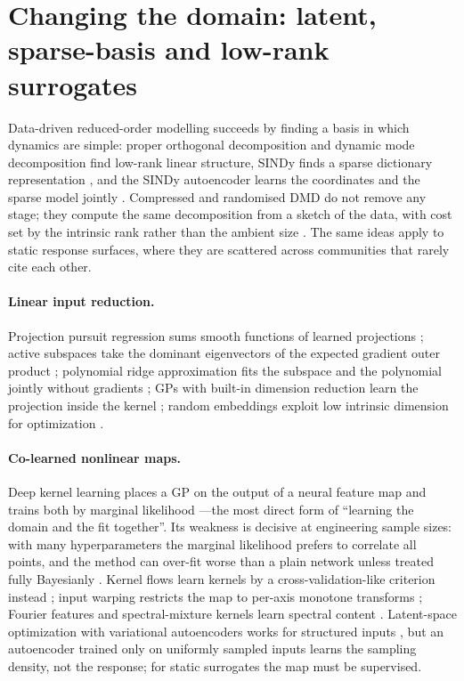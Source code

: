 \section{Changing the domain: latent, sparse-basis and low-rank surrogates}
\label{sec:latent}

Data-driven reduced-order modelling succeeds by finding a basis in which dynamics are simple: proper orthogonal
decomposition and dynamic mode decomposition find low-rank linear structure, SINDy finds a sparse dictionary
representation \cite{brunton2016discovering}, and the SINDy autoencoder learns the coordinates and the sparse model
jointly \cite{champion2019data}. Compressed and randomised DMD do not remove any stage; they compute the same
decomposition from a sketch of the data, with cost set by the intrinsic rank rather than the ambient size
\cite{erichson2019compressed,erichson2019randomized,halko2011finding}. The same ideas apply to static response surfaces,
where they are scattered across communities that rarely cite each other.

\paragraph{Linear input reduction.} Projection pursuit regression sums smooth functions of learned projections
\cite{friedman1981projection}; active subspaces take the dominant eigenvectors of the expected gradient outer product
\cite{constantine2015active}; polynomial ridge approximation fits the subspace and the polynomial jointly without
gradients \cite{hokanson2018data}; GPs with built-in dimension reduction learn the projection inside the kernel
\cite{tripathy2016gaussian}; random embeddings exploit low intrinsic dimension for optimization \cite{wang2016bayesian}.

\paragraph{Co-learned nonlinear maps.} Deep kernel learning places a GP on the output of a neural feature map and trains
both by marginal likelihood \cite{wilson2016deep}---the most direct form of ``learning the domain and the fit
together''. Its weakness is decisive at engineering sample sizes: with many hyperparameters the marginal likelihood
prefers to correlate all points, and the method can over-fit worse than a plain network unless treated fully
Bayesianly \cite{ober2021promises}. Kernel flows learn kernels by a cross-validation-like criterion instead
\cite{owhadi2019kernel}; input warping restricts the map to per-axis monotone transforms \cite{snoek2014input};
Fourier features and spectral-mixture kernels learn spectral content
\cite{tancik2020fourier,wilson2013gaussian}. Latent-space optimization with variational autoencoders works for
structured inputs \cite{gomezbombarelli2018automatic}, but an autoencoder trained only on uniformly sampled inputs learns
the sampling density, not the response; for static surrogates the map must be supervised.

